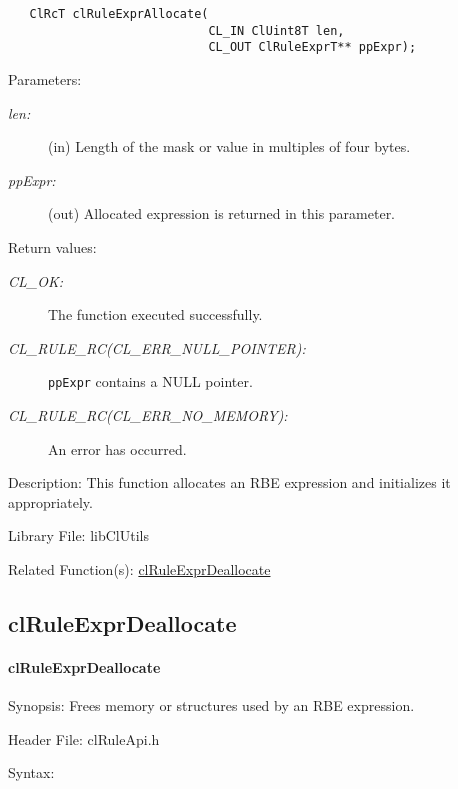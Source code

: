 \begin{flushleft}
\begin{Desc}
\footnotesize\begin{verbatim}   ClRcT clRuleExprAllocate(
              				CL_IN ClUint8T len,
              				CL_OUT ClRuleExprT** ppExpr);
\end{verbatim}
\normalsize
\end{Desc}
\begin{Desc}
\item[Parameters:]
\begin{description}
\item[{\em len:}](in) Length of the mask or value in multiples of four bytes. 
\item[{\em pp\-Expr:}](out) Allocated expression is returned in this parameter.\end{description}
\end{Desc}
\begin{Desc}
\item[Return values:]
\begin{description}
\item[{\em CL\_\-OK:}]The function executed successfully.
\item[{\em CL\_\-RULE\_\-RC(CL\_\-ERR\_\-NULL\_\-POINTER):}]{\tt{ppExpr}} contains a NULL pointer.
\item[{\em CL\_\-RULE\_\-RC(CL\_\-ERR\_\-NO\_\-MEMORY):}]An error has occurred.
\end{description}
\end{Desc}
\begin{Desc}
\item[Description:]This function allocates an RBE expression and initializes it appropriately.\end{Desc}
\begin{Desc}
\item[Library File:]lib\-Cl\-Utils\end{Desc}
\begin{Desc}
\item[Related Function(s):]\hyperlink{pagerule102}{cl\-Rule\-Expr\-Deallocate} \end{Desc}
\newpage


\subsection{clRuleExprDeallocate}
\hypertarget{pagerule102}{}\paragraph{cl\-Rule\-Expr\-Deallocate}\label{pagerule102}
\begin{Desc}
\item[Synopsis:]Frees memory or structures used by an RBE expression.\end{Desc}
\begin{Desc}
\item[Header File:]clRuleApi.h\end{Desc}
\begin{Desc}
\item[Syntax:]


\end{Desc}
\end{flushleft}

